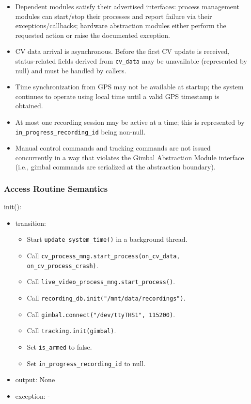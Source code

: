 \documentclass[12pt, titlepage]{article}
\begin{document}
\begin{itemize}
  \item Dependent modules satisfy their advertised interfaces: process management
        modules can start/stop their processes and report failure via their
        exceptions/callbacks; hardware abstraction modules either perform the requested
        action or raise the documented exception.
  \item CV data arrival is asynchronous. Before the first CV update is received,
        status-related fields derived from \texttt{cv\_data} may be unavailable
        (represented by null) and must be handled by callers.
  \item Time synchronization from GPS may not be available at startup; the system
        continues to operate using local time until a valid GPS timestamp is obtained.
  \item At most one recording session may be active at a time; this is represented by
        \texttt{in\_progress\_recording\_id} being non-null.
  \item Manual control commands and tracking commands are not issued concurrently in a
        way that violates the Gimbal Abstraction Module interface (i.e., gimbal
        commands are serialized at the abstraction boundary).
\end{itemize}

\subsubsection{Access Routine Semantics}

\noindent init():
\begin{itemize}
  \item transition:
        \begin{itemize}
          \item Start \texttt{update\_system\_time()} in a background thread.
          \item Call \texttt{cv\_process\_mng.start\_process(on\_cv\_data,
                  on\_cv\_process\_crash)}.
          \item Call \texttt{live\_video\_process\_mng.start\_process()}.
          \item Call \texttt{recording\_db.init("/mnt/data/recordings")}.
          \item Call \texttt{gimbal.connect("/dev/ttyTHS1", 115200)}.
          \item Call \texttt{tracking.init(gimbal)}.
          \item Set \texttt{is\_armed} to false.
          \item Set \texttt{in\_progress\_recording\_id} to null.
        \end{itemize}
  \item output: None
  \item exception: -
\end{itemize}
\end{document}
